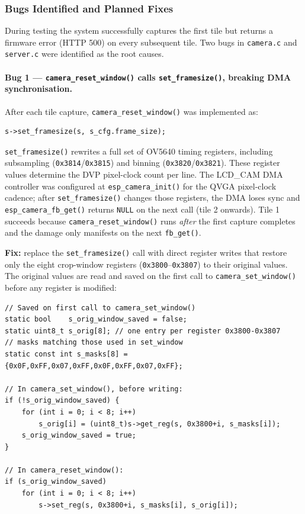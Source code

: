 \documentclass[12pt]{article}
\begin{document}
\subsubsection{Bugs Identified and Planned Fixes}

During testing the system successfully captures the first tile but returns a
firmware error (HTTP 500) on every subsequent tile.  Two bugs in
\texttt{camera.c} and \texttt{server.c} were identified as the root causes.

\paragraph{Bug 1 --- \texttt{camera\_reset\_window()} calls \texttt{set\_framesize()},
breaking DMA synchronisation.}

After each tile capture, \texttt{camera\_reset\_window()} was implemented as:

\begin{verbatim}
s->set_framesize(s, s_cfg.frame_size);
\end{verbatim}

\texttt{set\_framesize()} rewrites a full set of OV5640 timing registers,
including subsampling (\texttt{0x3814}/\texttt{0x3815}) and binning
(\texttt{0x3820}/\texttt{0x3821}).  These register values determine the DVP
pixel-clock count per line.  The LCD\_CAM DMA controller was configured at
\texttt{esp\_camera\_init()} for the QVGA pixel-clock cadence; after
\texttt{set\_framesize()} changes those registers, the DMA loses sync and
\texttt{esp\_camera\_fb\_get()} returns \texttt{NULL} on the next call (tile 2
onwards).  Tile 1 succeeds because \texttt{camera\_reset\_window()} runs
\emph{after} the first capture completes and the damage only manifests on the
next \texttt{fb\_get()}.

\textbf{Fix:} replace the \texttt{set\_framesize()} call with direct register
writes that restore only the eight crop-window registers
(\texttt{0x3800}--\texttt{0x3807}) to their original values.  The original
values are read and saved on the first call to \texttt{camera\_set\_window()}
before any register is modified:

\begin{verbatim}
// Saved on first call to camera_set_window()
static bool    s_orig_window_saved = false;
static uint8_t s_orig[8]; // one entry per register 0x3800-0x3807
// masks matching those used in set_window
static const int s_masks[8] = {0x0F,0xFF,0x07,0xFF,0x0F,0xFF,0x07,0xFF};

// In camera_set_window(), before writing:
if (!s_orig_window_saved) {
    for (int i = 0; i < 8; i++)
        s_orig[i] = (uint8_t)s->get_reg(s, 0x3800+i, s_masks[i]);
    s_orig_window_saved = true;
}

// In camera_reset_window():
if (s_orig_window_saved)
    for (int i = 0; i < 8; i++)
        s->set_reg(s, 0x3800+i, s_masks[i], s_orig[i]);
\end{verbatim}
\end{document}
